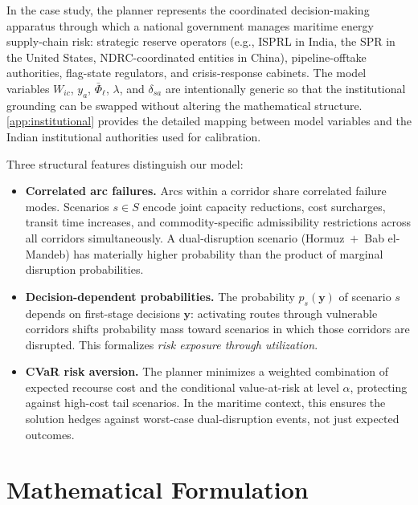 \documentclass[final,3p,authoryear]{elsarticle}
\theoremstyle{definition}
\begin{document}
In the case study, the planner represents the coordinated decision-making apparatus through which a national government manages maritime energy supply-chain risk: strategic reserve operators (e.g., ISPRL in India, the SPR in the United States, NDRC-coordinated entities in China), pipeline-offtake authorities, flag-state regulators, and crisis-response cabinets. The model variables $W_{ic}$, $y_a$, $\bar\Phi_\ell$, $\lambda$, and $\delta_{sa}$ are intentionally generic so that the institutional grounding can be swapped without altering the mathematical structure. \ref{app:institutional} provides the detailed mapping between model variables and the Indian institutional authorities used for calibration.





Three structural features distinguish our model:

\begin{itemize}[leftmargin=2em, itemsep=0.2em]
    \item \textbf{Correlated arc failures.} Arcs within a corridor share
    correlated failure modes. Scenarios $s \in S$ encode joint capacity
    reductions, cost surcharges, transit time increases, and
    commodity-specific admissibility restrictions across all corridors
    simultaneously. A dual-disruption scenario (Hormuz~$+$~Bab el-Mandeb)
    has materially higher probability than the product of marginal
    disruption probabilities.

    \item \textbf{Decision-dependent probabilities.} The probability
    $p_s(\mathbf{y})$ of scenario $s$ depends on first-stage decisions
    $\mathbf{y}$: activating routes through vulnerable corridors shifts
    probability mass toward scenarios in which those corridors are
    disrupted. This formalizes \emph{risk exposure through utilization}.

    \item \textbf{CVaR risk aversion.} The planner minimizes a weighted
    combination of expected recourse cost and the conditional value-at-risk
    at level $\alpha$, protecting against high-cost tail scenarios. In the
    maritime context, this ensures the solution hedges against worst-case
    dual-disruption events, not just expected outcomes.
\end{itemize}


\section{Mathematical Formulation}
\label{sec:model}
\end{document}
